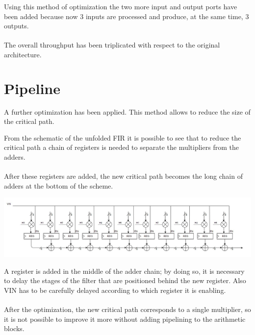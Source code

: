 Using this method of optimization the two more input and output ports have been added because
now 3 inputs are processed and produce, at the same time, 3 outputs. 
\paragraph{}
The overall throughput has
been triplicated with respect to the original architecture.


\section{Pipeline}

A further optimization has been applied. This method allows to reduce the size of the critical path.

From the schematic of the unfolded FIR it is possible to see that to reduce the critical path a chain of registers
is needed to separate the multipliers from the adders. 
\paragraph{}
After these registers are added, the new critical path 
becomes the long chain of adders at the bottom of the scheme.

\centerline{
\includegraphics[width=15.5cm]{./chapters/figures/fir_adv_1.jpg}}

\vspace{5mm}

A register is added in the middle of the adder chain; by doing so, it is necessary to delay the stages of the filter
that are positioned behind the new register. Also VIN has to be carefully delayed according to which register it is enabling.
\paragraph{}
After the optimization, the new critical path corresponds to a single multiplier, so it is not possible to improve it more
without adding pipelining to the arithmetic blocks.

